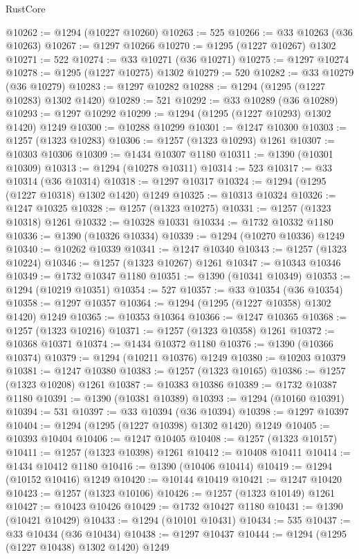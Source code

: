 \begin{lexlean}{RustCore}
\begin{coremodule}
@10262 := @1294 (@10227 @10260)
@10263 := 525
@10266 := @33 @10263 (@36 @10263)
@10267 := @1297 @10266
@10270 := @1295 (@1227 @10267) @1302
@10271 := 522
@10274 := @33 @10271 (@36 @10271)
@10275 := @1297 @10274
@10278 := @1295 (@1227 @10275) @1302
@10279 := 520
@10282 := @33 @10279 (@36 @10279)
@10283 := @1297 @10282
@10288 := @1294 (@1295 (@1227 @10283) @1302 @1420)
@10289 := 521
@10292 := @33 @10289 (@36 @10289)
@10293 := @1297 @10292
@10299 := @1294 (@1295 (@1227 @10293) @1302 @1420) @1249
@10300 := @10288 @10299
@10301 := @1247 @10300
@10303 := @1257 (@1323 @10283)
@10306 := @1257 (@1323 @10293) @1261
@10307 := @10303 @10306
@10309 := @1434 @10307 @1180
@10311 := @1390 (@10301 @10309)
@10313 := @1294 (@10278 @10311)
@10314 := 523
@10317 := @33 @10314 (@36 @10314)
@10318 := @1297 @10317
@10324 := @1294 (@1295 (@1227 @10318) @1302 @1420) @1249
@10325 := @10313 @10324
@10326 := @1247 @10325
@10328 := @1257 (@1323 @10275)
@10331 := @1257 (@1323 @10318) @1261
@10332 := @10328 @10331
@10334 := @1732 @10332 @1180
@10336 := @1390 (@10326 @10334)
@10339 := @1294 (@10270 @10336) @1249
@10340 := @10262 @10339
@10341 := @1247 @10340
@10343 := @1257 (@1323 @10224)
@10346 := @1257 (@1323 @10267) @1261
@10347 := @10343 @10346
@10349 := @1732 @10347 @1180
@10351 := @1390 (@10341 @10349)
@10353 := @1294 (@10219 @10351)
@10354 := 527
@10357 := @33 @10354 (@36 @10354)
@10358 := @1297 @10357
@10364 := @1294 (@1295 (@1227 @10358) @1302 @1420) @1249
@10365 := @10353 @10364
@10366 := @1247 @10365
@10368 := @1257 (@1323 @10216)
@10371 := @1257 (@1323 @10358) @1261
@10372 := @10368 @10371
@10374 := @1434 @10372 @1180
@10376 := @1390 (@10366 @10374)
@10379 := @1294 (@10211 @10376) @1249
@10380 := @10203 @10379
@10381 := @1247 @10380
@10383 := @1257 (@1323 @10165)
@10386 := @1257 (@1323 @10208) @1261
@10387 := @10383 @10386
@10389 := @1732 @10387 @1180
@10391 := @1390 (@10381 @10389)
@10393 := @1294 (@10160 @10391)
@10394 := 531
@10397 := @33 @10394 (@36 @10394)
@10398 := @1297 @10397
@10404 := @1294 (@1295 (@1227 @10398) @1302 @1420) @1249
@10405 := @10393 @10404
@10406 := @1247 @10405
@10408 := @1257 (@1323 @10157)
@10411 := @1257 (@1323 @10398) @1261
@10412 := @10408 @10411
@10414 := @1434 @10412 @1180
@10416 := @1390 (@10406 @10414)
@10419 := @1294 (@10152 @10416) @1249
@10420 := @10144 @10419
@10421 := @1247 @10420
@10423 := @1257 (@1323 @10106)
@10426 := @1257 (@1323 @10149) @1261
@10427 := @10423 @10426
@10429 := @1732 @10427 @1180
@10431 := @1390 (@10421 @10429)
@10433 := @1294 (@10101 @10431)
@10434 := 535
@10437 := @33 @10434 (@36 @10434)
@10438 := @1297 @10437
@10444 := @1294 (@1295 (@1227 @10438) @1302 @1420) @1249

\end{coremodule}
\end{lexlean}
